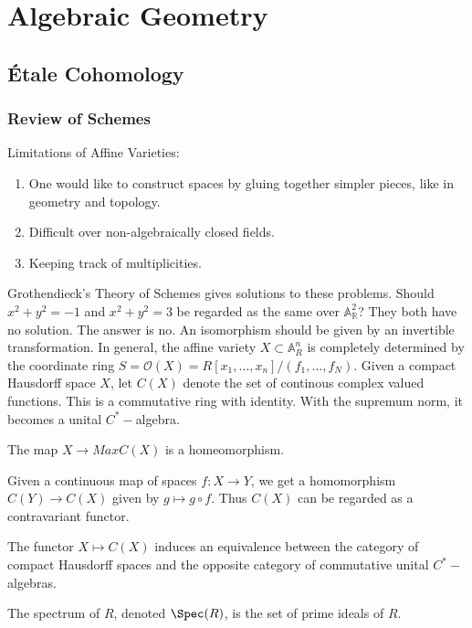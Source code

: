 \documentclass[crop=false,class=article,oneside]{standalone}
\begin{document}
    \ifx\ifgeoalg\undefined
        \section*{Algebraic Geometry}
        \setcounter{section}{1}
    \fi
\subsection{\'{E}tale Cohomology}
    \subsubsection{Review of Schemes}
    \begin{remark}
    Limitations of Affine Varieties:
    \begin{enumerate}
        \item One would like to construct spaces by gluing together simpler pieces, like in geometry and topology.
        \item Difficult over non-algebraically closed fields.
        \item Keeping track of multiplicities.
    \end{enumerate}
    \end{remark}
    Grothendieck's Theory of Schemes gives solutions to these problems. Should $x^{2}+y^{2}=-1$ and $x^{2}+y^{2}=3$ be regarded as the same over $\mathbb{A}_{\mathbb{R}}^{2}$? They both have no solution. The answer is no. An isomorphism should be given by an invertible transformation. In general, the affine variety $X\subset \mathbb{A}_{R}^n$ is completely determined by the coordinate ring $S = \mathcal{O}(X) = R[x_1,\hdots, x_n]/(f_1,\hdots, f_N)$. Given a compact Hausdorff space $X$, let $C(X)$ denote the set of continous complex valued functions. This is a commutative ring with identity. With the supremum norm, it becomes a unital $C^{*}-$algebra.
    \begin{theorem}
    The map $X\rightarrow MaxC(X)$ is a homeomorphism.
    \end{theorem}
    Given a continuous map of spaces $f:X\rightarrow Y$, we get a homomorphism $C(Y)\rightarrow C(X)$ given by $g\mapsto g\circ f$. Thus $C(X)$ can be regarded as a contravariant functor. 
    \begin{theorem}[Gelfand]
    The functor $X\mapsto C(X)$ induces an equivalence between the category of compact Hausdorff spaces and the opposite category of commutative unital $C^{*}-$algebras.
    \end{theorem}
    \begin{definition}
    The spectrum of $R$, denoted $\Spec(R)$, is the set of prime ideals of $R$.
    \end{definition}
\end{document}
